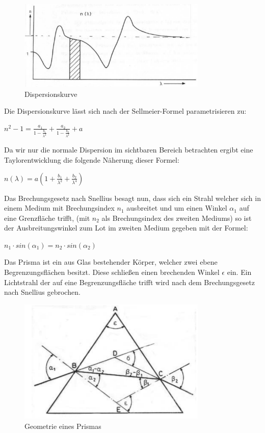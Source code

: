 \documentclass[a4paper, 11pt]{article}
\begin{document}
\begin{figure}[H]
	\centering
	\includegraphics[trim = 0mm 0mm 0mm 0mm,clip, width=9cm]{Bilder/Dispersionskurve.png}%
	\caption[Dispersionskurve]{Dispersionskurve}%
	\label{pic:Abbildung 1}%
\end{figure}



Die Dispersionskurve lässt sich nach der Sellmeier-Formel parametrisieren zu:
\begin{center}
$n^2-1=\frac{a_1}{1-\frac{b_1}{\lambda^2}}+\frac{a_2}{1-\frac{b_2}{\lambda^2}}+a$
\end{center}
Da wir nur die normale Dispersion im sichtbaren Bereich betrachten ergibt eine Taylorentwicklung die folgende Näherung dieser Formel:
\begin{center}
$n(\lambda )=a(1+\frac{b_1}{\lambda^2}+\frac{b_2}{\lambda^4 })$
\end{center}
Das Brechungsgesetz nach Snellius besagt nun, dass sich ein Strahl welcher sich in einem Medium mit Brechungsindex $n_1$ ausbreitet und um einen Winkel $\alpha_1$ auf eine Grenzfläche trifft, (mit $n_2$ als Brechungsindex des zweiten Mediums) so ist der Ausbreitungswinkel zum Lot im zweiten Medium gegeben mit der Formel:
\begin{center}
$n_1 \cdot sin(\alpha_1)= n_2 \cdot sin(\alpha_2)$
\end{center}

Das Prisma ist ein aus Glas bestehender Körper, welcher zwei ebene Begrenzungsflächen besitzt. Diese schließen einen brechenden Winkel $\epsilon$ ein. Ein Lichtstrahl der auf eine Begrenzungsfläche trifft wird nach dem Brechungsgesetz nach Snellius gebrochen.  


\begin{figure}[H]
	\centering
	\includegraphics[trim = 0mm 0mm 0mm 0mm,clip, width=9cm]{Bilder/Prismengeometrie.png}%
	\caption[Geometrie eines Prismas]{Geometrie eines Prismas}%
	\label{pic:Abbildung 1}%
\end{figure}
\end{document}
